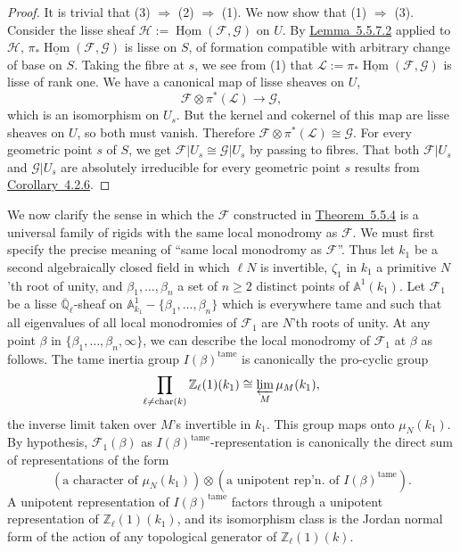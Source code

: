 \begin{proof}
It is trivial that (3) \(\Rightarrow\) (2) \(\Rightarrow\) (1). We now show
that (1) \(\Rightarrow\) (3). Consider the lisse sheaf
\(\mathcal{H}:=\underline{\operatorname{Hom}}(\mathcal{F},\mathcal{G})\) on
\(U\). By \hyperref[lem:5.5.7.2]{Lemma~5.5.7.2} applied to \(\mathcal{H}\),
\(\pi_*\underline{\operatorname{Hom}}(\mathcal{F},\mathcal{G})\) is lisse on
\(S\), of formation compatible with arbitrary change of base on \(S\). Taking
the fibre at \(s\), we see from (1) that
\(\mathcal{L}:=\pi_*\underline{\operatorname{Hom}}(\mathcal{F},\mathcal{G})\)
is lisse of rank one. We have a canonical map of lisse sheaves on \(U\),
\[
  \mathcal{F}\otimes\pi^*(\mathcal{L})\to\mathcal{G},
\]
which is an isomorphism on \(U_s\). But the kernel and cokernel of this map are
lisse sheaves on \(U\), so both must vanish. Therefore
\(\mathcal{F}\otimes\pi^*(\mathcal{L})\cong\mathcal{G}\). For every geometric
point \(s\) of \(S\), we get
\(\mathcal{F}\vert U_s\cong\mathcal{G}\vert U_s\) by passing to fibres. That
both \(\mathcal{F}\vert U_s\) and \(\mathcal{G}\vert U_s\) are absolutely
irreducible for every geometric point \(s\) results from
\hyperref[cor:4.2.6]{Corollary~4.2.6}.
\end{proof}

We now clarify the sense in which the \(\mathcal{F}\) constructed in
\hyperref[thm:5.5.4]{Theorem~5.5.4} is a universal family of rigids with the
same local monodromy as \(\mathcal{F}\). We must first specify the precise
meaning of ``same local monodromy as \(\mathcal{F}\)''. Thus let \(k_1\) be a
second algebraically closed field in which \(\ell N\) is invertible,
\(\zeta_1\) in \(k_1\) a primitive \(N\)'th root of unity, and
\(\beta_1,\ldots,\beta_n\) a set of \(n\geq 2\) distinct points of
\(\mathbb{A}^1(k_1)\). Let \(\mathcal{F}_1\) be a lisse
\(\overline{\mathbb{Q}}_\ell\)-sheaf on
\(\mathbb{A}^1_{k_1}-\{\beta_1,\ldots,\beta_n\}\) which is everywhere tame and
such that all eigenvalues of all local monodromies of \(\mathcal{F}_1\) are
\(N\)'th roots of unity. At any point
\(\beta\) in \(\{\beta_1,\ldots,\beta_n,\infty\}\), we can describe the local
monodromy of \(\mathcal{F}_1\) at \(\beta\) as follows. The tame inertia group
\(I(\beta)^{\mathrm{tame}}\) is canonically the pro-cyclic group
\[
  \prod_{\ell\neq\operatorname{char}(k)}\mathbb{Z}_\ell(1)(k_1)
  \cong\varprojlim_M\mu_M(k_1),
\]
the inverse limit taken over \(M\)'s invertible in \(k_1\). This group maps
onto \(\mu_N(k_1)\). By hypothesis, \(\mathcal{F}_1(\beta)\) as
\(I(\beta)^{\mathrm{tame}}\)-representation is canonically the direct sum of
representations of the form
\[
  (\text{a character of \(\mu_N(k_1)\)})\otimes
  (\text{a unipotent rep'n. of \(I(\beta)^{\mathrm{tame}}\)}).
\]
A unipotent representation of \(I(\beta)^{\mathrm{tame}}\) factors through a
unipotent representation of \(\mathbb{Z}_\ell(1)(k_1)\), and its isomorphism
class is the Jordan normal form of the action of any topological generator of
\(\mathbb{Z}_\ell(1)(k)\).

